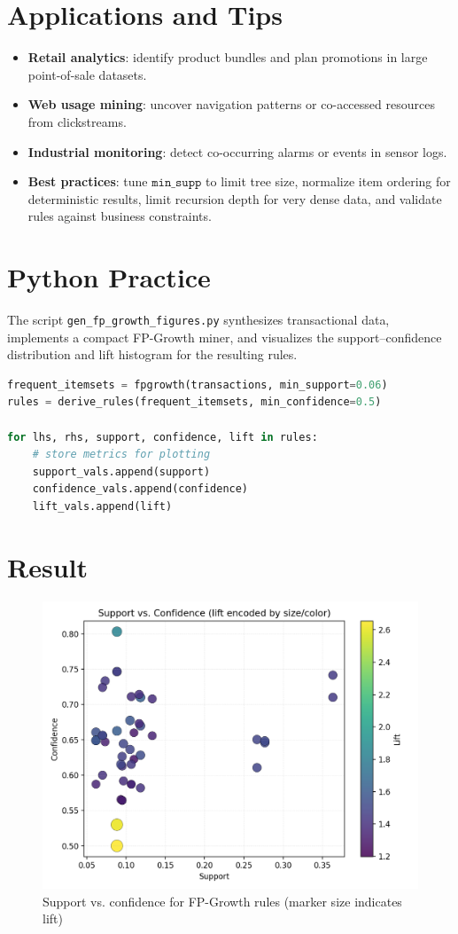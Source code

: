 ﻿\documentclass[12pt]{article}
\begin{document}
\section{Applications and Tips}
\begin{itemize}
  \item \textbf{Retail analytics}: identify product bundles and plan promotions in large point-of-sale datasets.
  \item \textbf{Web usage mining}: uncover navigation patterns or co-accessed resources from clickstreams.
  \item \textbf{Industrial monitoring}: detect co-occurring alarms or events in sensor logs.
  \item \textbf{Best practices}: tune \(\texttt{min\_supp}\) to limit tree size, normalize item ordering for deterministic results, limit recursion depth for very dense data, and validate rules against business constraints.
\end{itemize}

\section{Python Practice}
The script \texttt{gen\_fp\_growth\_figures.py} synthesizes transactional data, implements a compact FP-Growth miner, and visualizes the support--confidence distribution and lift histogram for the resulting rules.
\begin{lstlisting}[language=Python,caption={Excerpt from gen_fp_growth_figures.py}]
frequent_itemsets = fpgrowth(transactions, min_support=0.06)
rules = derive_rules(frequent_itemsets, min_confidence=0.5)

for lhs, rhs, support, confidence, lift in rules:
    # store metrics for plotting
    support_vals.append(support)
    confidence_vals.append(confidence)
    lift_vals.append(lift)
\end{lstlisting}

\section{Result}
\begin{figure}[H]
  \centering
  \includegraphics[width=0.82\linewidth]{fpgrowth_support_confidence.png}
  \caption{Support vs. confidence for FP-Growth rules (marker size indicates lift)}
  \label{fig:fpgrowth_support_confidence}
\end{figure}
\end{document}
